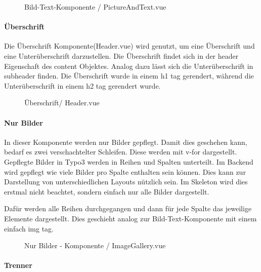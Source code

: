 \begin{figure}[htb]
\centering
{}
\caption{Bild-Text-Komponente / PictureAndText.vue}
\label{fig:Bild-Text-Komponente}
\end{figure}

\pagebreak

\paragraph{Überschrift}
Die Überschrift Komponente(Header.vue) wird genutzt, um eine Überschrift und eine Unterüberschrift darzustellen. Die Überschrift findet sich in der header Eigenschaft des content Objektes. Analog dazu lässt sich die Unterüberschrift in subheader finden. Die Überschrift wurde in einem h1 tag gerendert, während die Unterüberschrift in einem h2 tag gerendert wurde.

\begin{figure}[htb]
\centering
{}
\caption{Überschrift/ Header.vue}
\label{fig:berschrift/ Header.vue}
\end{figure}

\paragraph{Nur Bilder}

In dieser Komponente werden nur Bilder gepflegt. Damit dies geschehen kann, bedarf es zwei verschachtelter Schleifen. Diese werden mit v-for dargestellt. Gepflegte Bilder in Typo3 werden in Reihen und Spalten unterteilt. Im Backend wird gepflegt wie viele Bilder pro Spalte enthalten sein können. Dies kann zur Darstellung von unterschiedlichen Layouts nützlich sein. Im Skeleton wird dies erstmal nicht beachtet, sondern einfach nur alle Bilder dargestellt. 

Dafür werden alle Reihen durchgegangen und dann für jede Spalte das jeweilige Elemente dargestellt. Dies geschieht analog zur Bild-Text-Komponente mit einem einfach img tag.

\begin{figure}[htb]
\centering
{}
\caption{Nur Bilder - Komponente / ImageGallery.vue}
\label{fig:Nur Bilder - Komponente}
\end{figure}

\paragraph{Trenner}


